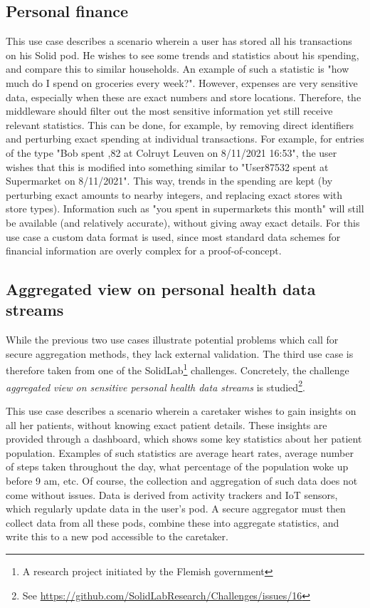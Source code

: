 \subsection{Personal finance}
\label{usecase:personal-finance}
This use case describes a scenario wherein a user has stored all his transactions on his Solid pod. He wishes to see some trends and statistics about his spending, and compare this to similar households. An example of such a statistic is "how much do I spend on groceries every week?".  However, expenses are very sensitive data, especially when these are exact numbers and store locations. Therefore, the middleware should filter out the most sensitive information yet still receive relevant statistics. This can be done, for example, by removing direct identifiers and perturbing exact spending at individual transactions. For example, for entries of the type "Bob spent ,82 at Colruyt Leuven on 8/11/2021 16:53", the user wishes that this is modified into something similar to "User87532 spent  at Supermarket on 8/11/2021". This way, trends in the spending are kept (by perturbing exact amounts to nearby integers, and replacing exact stores with store types). Information such as "you spent  in supermarkets this month" will still be available (and relatively accurate), without giving away exact details. For this use case a custom data format is used, since most standard data schemes for financial information are overly complex for a proof-of-concept.

\subsection{Aggregated view on personal health data streams}
While the previous two use cases illustrate potential problems which call for secure aggregation methods, they lack external validation. The third use case is therefore taken from one of the SolidLab\footnote{A research project initiated by the Flemish government } challenges. Concretely, the challenge \textit{aggregated view on sensitive personal health data streams} is studied\footnote{See \url{https://github.com/SolidLabResearch/Challenges/issues/16}}.

This use case describes a scenario wherein a caretaker wishes to gain insights on all her patients, without knowing exact patient details. These insights are provided through a dashboard, which shows some key statistics about her patient population. Examples of such statistics are average heart rates, average number of steps taken throughout the day, what percentage of the population woke up before 9 am, etc. Of course, the collection and aggregation of such data does not come without issues. Data is derived from activity trackers and IoT sensors, which regularly update data in the user's pod. A secure aggregator must then collect data from all these pods, combine these into aggregate statistics, and write this to a new pod accessible to the caretaker.


